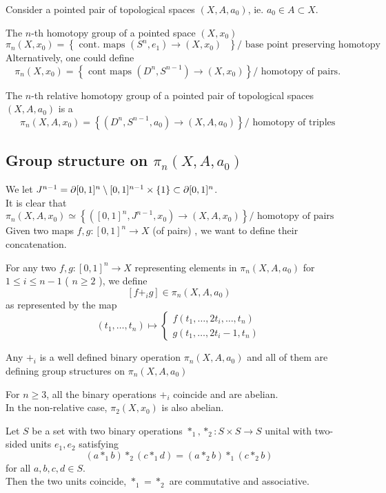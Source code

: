 \documentclass[../main.tex]{subfiles}
\begin{document}
Consider a pointed pair of topological spaces $( X,A, a_0) $, ie. $a_0\in A \subset X$.\\
\begin{defn}
	The $n$-th homotopy group of a pointed space $( X,x_0) $ 
	\[ 
	\pi_n( X,x_0) = \left\{ \text{ cont. maps $( S^{n},e_1) \to ( X,x_0) $  }  \right\} / \text{ base point preserving homotopy } 
	\]
Alternatively, one could define
\[ 
\pi_n( X,x_0) = \left\{ \text{ cont maps } ( D^{n},S^{n-1}) \to ( X,x_0)   \right\} / \text{ homotopy of pairs. } 
\]

\end{defn}
\begin{defn}
	The $n$-th relative homotopy group of a pointed pair of topological spaces $ ( X, A,a_0) $ is a 
	\[ 
	\pi_n( X,A,x_0) = \left\{ ( D^{n},S^{n-1}, a_0)\to ( X,A,a_0)   \right\} / \text{ homotopy of triples } 
	\]
	
\end{defn}
\subsection{Group structure on $\pi_n( X,A,a_0) $ }
We let $J^{n-1}= \partial [ 0,1]^{n}\setminus [ 0,1]^{n-1}\times \left\{ 1 \right\} \subset \partial [ 0,1]^{n}$.\\
It is clear that $\pi_n( X,A,x_0) \simeq \left\{ ( [ 0,1]^{n}, J^{n-1}, x_0)\to ( X,A,x_0)   \right\} / \text{ homotopy of pairs } $ 
Given two maps $f,g: [ 0,1]^{n}\to X$ (of pairs) , we want to define their concatenation.\\
\begin{defn}
	For any two $f,g : [ 0,1]^{n}\to X$ representing elements in $\pi_n( X,A,a_0) $ for $1 \leq i \leq n-1$ ( $n \geq 2$ ), we define
	\[ 
	[ f+_i g] \in \pi_n( X,A,a_0) 
	\]
as represented by the map
\[ 
	( t_1,\ldots,t_n) \mapsto
	\begin{cases}
	f( t_1,\ldots, 2t_i, \ldots,t_n) \\
	g( t_1,\ldots, 2t_i -1, t_n) 
	\end{cases}
\]
\end{defn}
\begin{lemma}
Any $+_i$ is a well defined binary operation $\pi_n( X,A,a_0) $ and all of them are defining group structures on $\pi_n( X,A,a_0) $ 
\end{lemma}
\begin{propo}
For $n \geq 3$, all the binary operations $+_i$ coincide and are abelian.\\
In the non-relative case, $\pi_2( X,x_0) $ is also abelian.
\end{propo}
\begin{lemma}
Let $S$ be a set with two binary operations $\ast_1,\ast_2: S\times S \to S$ unital with two-sided units $ e_1, e_2$ satisfying 
\[ 
	( a\ast_1 b) \ast_2 ( c\ast_1 d) = ( a\ast_2 b) \ast_1 ( c\ast_2 b) 
\]
for all $a,b,c,d\in S$.\\
Then the two units coincide, $\ast_1= \ast_2$  are commutative and associative.

\end{lemma}
\end{document}
